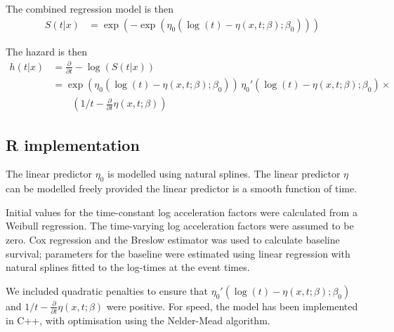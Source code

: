 \documentclass{article}
\begin{document}
The combined regression model is then
\begin{align*}
  S(t|x) &= \exp(-\exp(\eta_0(\log(t) -\eta(x,t; \beta);\beta_0)))
\end{align*}

The hazard is then
\begin{align*}
  h(t|x) &= \frac{\partial}{\partial t} -\log(S(t|x)) \\
         &= \exp(\eta_0(\log(t) -\eta(x,t; \beta);\beta_0))\, \eta_0'(\log(t) -\eta(x,t; \beta);\beta_0)\times \\
         &\qquad \left(1/t-\frac{\partial}{\partial t}\eta(x,t; \beta)\right)
\end{align*}


\subsection{R implementation}

The linear predictor $\eta_0$ is modelled using natural splines. The linear predictor $\eta$ can be modelled freely provided the linear predictor is a smooth function of time.

Initial values for the time-constant log acceleration factors were calculated from a Weibull regression. The time-varying log acceleration factors were assumed to be zero.  Cox regression and the Breslow estimator was used to calculate baseline survival; parameters for the baseline were estimated using linear regression with natural splines fitted to the log-times at the event times. 

We included quadratic penalties to ensure that $\eta_0'(\log(t) -\eta(x,t; \beta);\beta_0)$ and $1/t-\frac{\partial}{\partial t}\eta(x,t; \beta)$ were positive. For speed, the model has been implemented in C++, with optimisation using the Nelder-Mead algorithm.
\end{document}

